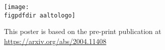 \documentclass[landscape,a1,final]{a0poster} %
\def\figpdfdir{fig/} %
\begin{document}
\begin{minipage}[t]{1\linewidth}
\begin{minipage}[t]{0.22\linewidth}
				
\end{minipage}
\hspace{15mm}
\begin{minipage}[t]{0.09\linewidth}
\vspace{10mm}

\texttt{[image: \\figpdfdir aaltologo]}
\end{minipage}


\end{minipage}


\sffamily
\normalsize %

\vspace{1cm}
This poster is based on the pre-print publication at {\url{https://arxiv.org/abs/2004.11408}}


\centering
\end{document}
